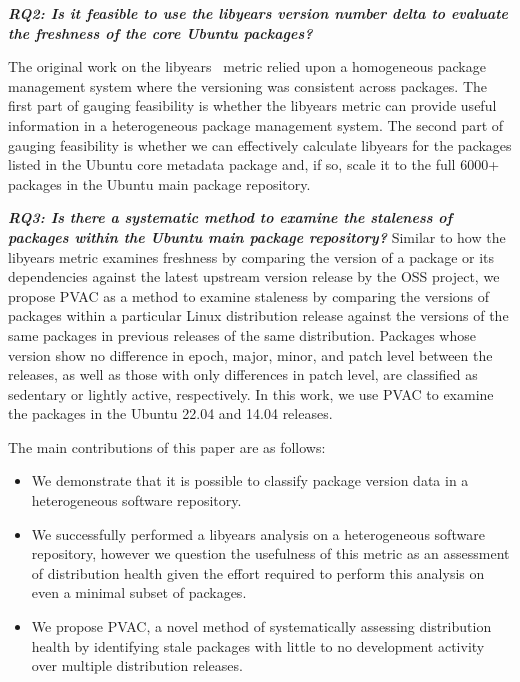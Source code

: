 \documentclass[sn-mathphys-num]{sn-jnl}%
\theoremstyle{thmstyleone}%
\theoremstyle{thmstyletwo}%
\theoremstyle{thmstylethree}%
\begin{document}
\textit{\textbf{RQ2: Is it feasible to use the libyears version number delta to evaluate the freshness of the core Ubuntu packages?} }

The original work on the libyears~\cite{noauthor_metric_nodate} metric relied upon a homogeneous package management system where the versioning was consistent across packages. The first part of gauging feasibility is whether the libyears metric can provide useful information in a heterogeneous package management system. The second part of gauging feasibility is whether we can effectively calculate libyears for the packages listed in the Ubuntu core metadata package and, if so, scale it to the full 6000+ packages in the Ubuntu main package repository. 

\textit{\textbf{RQ3: Is there a systematic method to examine the staleness of packages within the Ubuntu main package repository?} }
Similar to how the libyears metric examines freshness by comparing the version of a package or its dependencies against the latest upstream version release by the OSS project, we propose PVAC as a method to examine staleness by comparing the versions of packages within a particular Linux distribution release against the versions of the same packages in previous releases of the same distribution. Packages whose version show no difference in epoch, major, minor, and patch level between the releases, as well as those with only differences in patch level, are classified as sedentary or lightly active, respectively. In this work, we use PVAC to examine the packages in the Ubuntu 22.04 and 14.04 releases.

The main contributions of this paper are as follows:
\begin{itemize}
    \item We demonstrate that it is possible to classify package version data in a heterogeneous software repository. 
    \item We successfully performed a libyears analysis on a heterogeneous software repository, however we question the usefulness of this metric as an assessment of distribution health given the effort required to perform this analysis on even a minimal subset of packages.
    \item We propose PVAC, a novel method of systematically assessing distribution health by identifying stale packages with little to no development activity over multiple distribution releases. 
\end{itemize}
\end{document}
